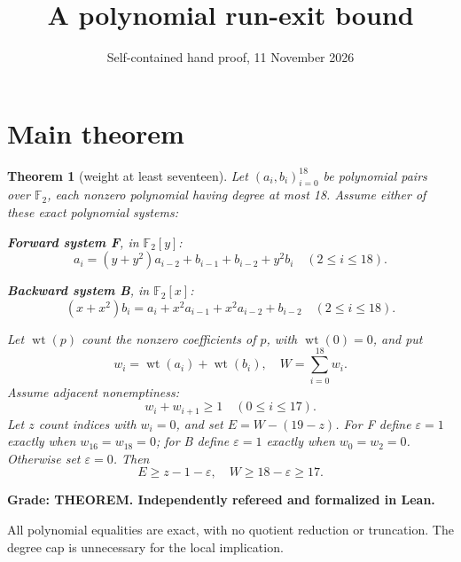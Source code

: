 \documentclass{article}
\title{A polynomial run-exit bound}
\author{}
\date{Self-contained hand proof, 11 November 2026}
\newtheorem*{maintheorem}{Theorem}
\DeclareMathOperator{\wt}{wt}
\begin{document}
\maketitle

\section{Main theorem}\label{sec:main}

\begin{maintheorem}[weight at least seventeen]
  Let \((a_i,b_i)_{i=0}^{18}\) be polynomial pairs over \(\mathbb{F}_2\), each nonzero polynomial
  having degree at most 18. Assume either of these exact polynomial systems:

  \textbf{Forward system F}, in \(\mathbb{F}_2[y]\):
  \begin{equation}\label{eq:forward}
    a_i = (y + y^2) a_{i-2} + b_{i-1} + b_{i-2} + y^2 b_i \quad (2 \le i \le 18).
  \end{equation}

  \textbf{Backward system B}, in \(\mathbb{F}_2[x]\):
  \begin{equation}\label{eq:backward}
    (x + x^2) b_i = a_i + x^2 a_{i-1} + x^2 a_{i-2} + b_{i-2} \quad (2 \le i \le 18).
  \end{equation}

  Let \(\wt(p)\) count the nonzero coefficients of \(p\), with \(\wt(0) = 0\), and put
  \begin{equation}
    w_i = \wt(a_i) + \wt(b_i), \quad W = \sum_{i=0}^{18} w_i.
  \end{equation}
  Assume adjacent nonemptiness:
  \begin{equation}\label{eq:adjacent}
    w_i + w_{i+1} \ge 1 \quad (0 \le i \le 17).
  \end{equation}
  Let \(z\) count indices with \(w_i = 0\), and set \(E = W - (19 - z)\). For F define
  \(\varepsilon = 1\) exactly when \(w_{16} = w_{18} = 0\); for B define \(\varepsilon = 1\) exactly
  when \(w_0 = w_2 = 0\). Otherwise set \(\varepsilon = 0\). Then
  \begin{equation}\label{eq:main-bound}
    E \ge z - 1 - \varepsilon, \quad W \ge 18 - \varepsilon \ge 17.
  \end{equation}
\end{maintheorem}

\textbf{Grade: THEOREM. Independently refereed and formalized in Lean.}

All polynomial equalities are exact, with no quotient reduction or truncation. The degree cap is
unnecessary for the local implication.
\end{document}
